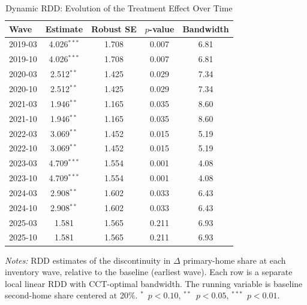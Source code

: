 \begin{table}[htbp]
\centering
\caption{Dynamic RDD: Evolution of the Treatment Effect Over Time}
\label{tab:dynamic}
\begin{tabular}{lcccc}
\toprule
Wave & Estimate & Robust SE & $p$-value & Bandwidth \\
\midrule
2019-03 & 4.026$^{***}$ & 1.708 & 0.007 & 6.81 \\
2019-10 & 4.026$^{***}$ & 1.708 & 0.007 & 6.81 \\
2020-03 & 2.512$^{**}$ & 1.425 & 0.029 & 7.34 \\
2020-10 & 2.512$^{**}$ & 1.425 & 0.029 & 7.34 \\
2021-03 & 1.946$^{**}$ & 1.165 & 0.035 & 8.60 \\
2021-10 & 1.946$^{**}$ & 1.165 & 0.035 & 8.60 \\
2022-03 & 3.069$^{**}$ & 1.452 & 0.015 & 5.19 \\
2022-10 & 3.069$^{**}$ & 1.452 & 0.015 & 5.19 \\
2023-03 & 4.709$^{***}$ & 1.554 & 0.001 & 4.08 \\
2023-10 & 4.709$^{***}$ & 1.554 & 0.001 & 4.08 \\
2024-03 & 2.908$^{**}$ & 1.602 & 0.033 & 6.43 \\
2024-10 & 2.908$^{**}$ & 1.602 & 0.033 & 6.43 \\
2025-03 & 1.581 & 1.565 & 0.211 & 6.93 \\
2025-10 & 1.581 & 1.565 & 0.211 & 6.93 \\
\bottomrule
\end{tabular}
\begin{tablenotes}[flushleft]\footnotesize
\item \textit{Notes:} RDD estimates of the discontinuity in $\Delta$ primary-home share at each inventory wave, relative to the baseline (earliest wave). Each row is a separate local linear RDD with CCT-optimal bandwidth. The running variable is baseline second-home share centered at 20\%. $^{*}$~$p<0.10$, $^{**}$~$p<0.05$, $^{***}$~$p<0.01$.
\end{tablenotes}
\end{table}
